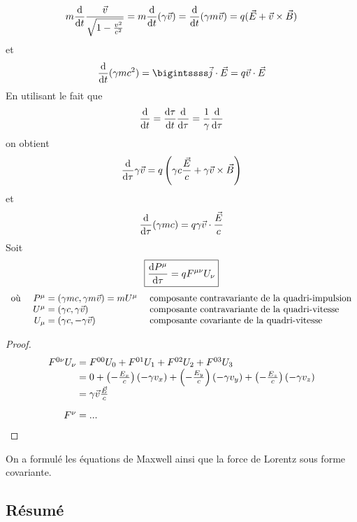 $$
	m\frac{\mathrm{d}}{\mathrm{d} t}\frac{\vec{v}}{\sqrt{1-\frac{v^2}{c^2}}}=m\frac{\mathrm{d} }{\mathrm{d} t}(\gamma\vec{v})=\frac{\mathrm{d} }{\mathrm{d} t}(\gamma m \vec{v})=q(\vec{E}+\vec{v}\times\vec{B})
$$
et
$$
	\frac{\dif}{\dif t}(\gamma m c^2)=\bigintssss\vec{j}\cdot\vec{E}=q\vec{v}\cdot\vec{E}
$$
En utilisant le fait que
$$
	\frac{\mathrm{d}}{\mathrm{d} t}=\frac{\mathrm{d}\tau}{\mathrm{d} t}\frac{\mathrm{d}}{\mathrm{d}\tau}=\frac{1}{\gamma}\frac{\mathrm{d}}{\mathrm{d}\tau}\\
$$
on obtient
$$
	\frac{\mathrm{d}}{\mathrm{d}\tau}\gamma\vec{v}=q\left(\gamma c\frac{\vec{E}}{c}+\gamma\vec{v}\times\vec{B}\right)
$$
et
$$
	\frac{\mathrm{d}}{\mathrm{d}\tau}(\gamma mc)=q\gamma\vec{v}\cdot\frac{\vec{E}}{c}
$$
Soit
$$
	\boxed{\frac{\mathrm{d} P^\mu}{\mathrm{d}\tau}=qF^{\mu\nu}U_\nu}
$$
{\renewcommand*{\arraystretch}{1.2}
$$
	\begin{array}{lr@{\;}ll}
		\text{o\`u }&P^\mu&=(\gamma mc,\gamma m\vec{v})=mU^\mu&\text{ composante contravariante de la quadri-impulsion}\\
		&U^\mu&=(\gamma c,\gamma\vec{v})&\text{ composante contravariante de la quadri-vitesse}\\
		&U_\mu&=(\gamma c,-\gamma\vec{v})&\text{ composante covariante de la quadri-vitesse}
	\end{array}
$$}

\begin{proof}
$$
	\begin{array}{r@{\;}l}
		F^{0\nu}U_\nu&=F^{00}U_0+F^{01}U_1+F^{02}U_2+F^{03}U_3\\
			&=0+\left(-\frac{E_x}{c}\right)(-\gamma v_x)+\left(-\frac{E_y}{c}\right)(-\gamma v_y)+\left(-\frac{E_z}{c}\right)(-\gamma v_z)\\
			&=\gamma\vec{v}\frac{\vec{E}}{c}\\[10pt]
		F^{\nu}&=...
	\end{array}
$$
\end{proof}

\begin{conc}
On a formulé les équations de Maxwell ainsi que la force de Lorentz sous forme covariante.
\end{conc}

\subsection{Résumé}

